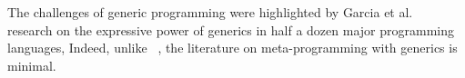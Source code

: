 The challenges of \Java generic programming were highlighted by Garcia et
al.~\cite{Garcia:Jarvi:Lumsdaine:Siek:Willcock:03} research on the expressive
power of generics in half a dozen major programming languages,
Indeed, unlike \CC~\cite{Austern:98,Musser:Stepanov:1989,
Backhouse:Jansson:1999, Dehnert:Stepanov:2000,Gil:Gutterman:98,Abrahams:Gurtovoy:04}, the literature on meta-programming with \Java
generics is minimal.
